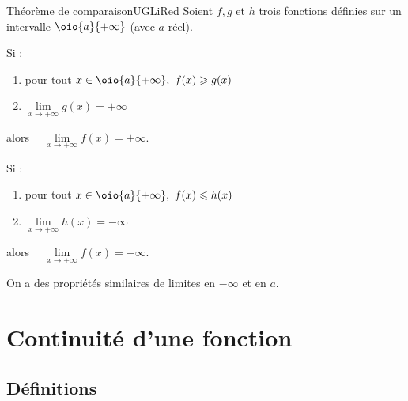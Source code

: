 \documentclass[a4paper,11pt,cours]{nsi} %
\begin{document}
\begin{encadrecolore}{Théorème de comparaison}{UGLiRed}
	Soient $f,g$ et $h$ trois fonctions définies sur un intervalle $\oio{a}{+\infty}$ (avec $a$ réel).
	\begin{multicols}{2}
		\begin{minipage}{1cm}
			Si :\\
			\vspace*{.9cm}
		\end{minipage}
		\begin{minipage}{7cm}
			\begin{enumerate}[label=\textbullet]
				\item pour tout $x\in\oio{a}{+\infty}, \  f(x)\geqslant g(x)$
				\item $\lim\limits_{x\to+\infty} g(x) = +\infty$\\
			\end{enumerate}
		\end{minipage}
		alors $\quad \lim\limits_{x\to+\infty} f(x)=+\infty$.

		\begin{minipage}{1cm}
			Si :\\
			\vspace*{.9cm}
		\end{minipage}
		\begin{minipage}{7cm}
			\begin{enumerate}[label=\textbullet]
				\item pour tout $x\in\oio{a}{+\infty}, \ f(x)\leqslant h(x)$
				\item $\lim\limits_{x\to+\infty} h(x) = -\infty$\\
			\end{enumerate}
		\end{minipage}
		alors $\quad \lim\limits_{x\to+\infty} f(x)=-\infty$.
	\end{multicols}
\end{encadrecolore}	

\begin{remarque}[]
	On a des propriétés similaires de limites en $-\infty$ et en $a$.
\end{remarque}

\section{Continuité d'une fonction}
\subsection*{Définitions}
\end{document}
